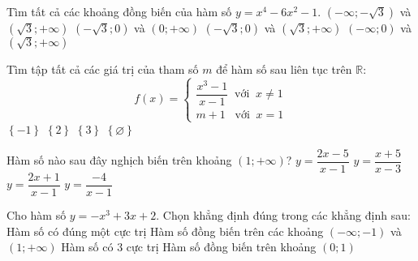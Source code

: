 \begin{ex}%
Tìm tất cả các khoảng đồng biến của hàm số $y=x^4-6x^2-1$.
\choice
{$\left(  - \infty ; - \sqrt 3  \right)$ và $\left( \sqrt{3};+\infty \right)$}
{$\left(-\sqrt{3}; 0 \right)$ và $\left( 0;+\infty \right)$}
{\True $\left( - \sqrt3 ; 0  \right)$ và $\left( \sqrt{3};+\infty \right)$}
{$\left( - \infty ; 0  \right)$ và $\left( \sqrt{3};+\infty \right)$}
\end{ex}
\begin{ex}%
Tìm tập tất cả các giá trị của tham số $m$ để hàm số sau liên tục trên $\mathbb{R}$: $$f\left( x \right) = \left\{ \begin{array}{l}
\dfrac{{{x^3} - 1}}{{x - 1}} \;\; \text{với}\;\; x \ne 1\\
m + 1 \;\;\;\text{với}\;\; x = 1
\end{array} \right.$$
\choice
{$\left\{  - 1 \right\}$}
{\True $\left\{ 2 \right\}$}
{$\left\{ 3 \right\}$}
{$\left\{ \varnothing \right\}$}
\end{ex}
\begin{ex}%
Hàm số nào sau đây nghịch biến trên khoảng $\left(1;+\infty \right)$?
\choice
{$y=\dfrac{2x-5}{x-1}$}
{$y=\dfrac{x+5}{x-3}$}
{\True$y=\dfrac{2x+1}{x-1}$}
{$y=\dfrac{-4}{x-1}$}
\end{ex}
\begin{ex}%
Cho hàm số $y=-x^3+3x+2$. Chọn khẳng định đúng trong các khẳng định sau:
\choice
{Hàm số có đúng một cực trị}
{Hàm số đồng biến trên các khoảng $\left(-\infty;-1 \right)$ và $\left(1;+\infty \right)$}
{Hàm số có $3$ cực trị}
{\True Hàm số đồng biến trên khoảng $\left(0;1\right)$}
\end{ex}
\begin{ex}%
{
}
\end{ex}
